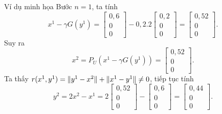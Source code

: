 \documentclass[aspectratio=169]{beamer}
\DeclarePairedDelimiter{\norm}{\lVert}{\rVert}
\theoremstyle{plain}
\theoremstyle{definition}
\theoremstyle{remark}
\begin{document}
\begin{frame}{Ví dụ minh họa}
Bước $n=1$, ta tính 
    $$x^1-\gamma G(y^1)= \begin{bmatrix}
    0,6\\0\\0
    \end{bmatrix}-0,2.2\begin{bmatrix}
    0,2\\0\\0
    \end{bmatrix}= \begin{bmatrix}
    0,52\\0\\0
    \end{bmatrix}.$$
    Suy ra 
    $$x^2=P_U(x^1-\gamma G(y^1))=\begin{bmatrix}
    0,52\\0\\0
    \end{bmatrix}.$$
    Ta thấy $r(x^1,y^1)=\norm{y^1-x^2}+\norm{x^1-y^1}\neq0$, tiếp tục tính $$
    y^2 = 2x^2-x^1=2\begin{bmatrix}
    0,52\\0\\0
    \end{bmatrix}-\begin{bmatrix}
    0,6\\0\\0
    \end{bmatrix}=\begin{bmatrix}
    0,44\\0\\0
    \end{bmatrix}.
    $$
\end{frame}
\end{document}
